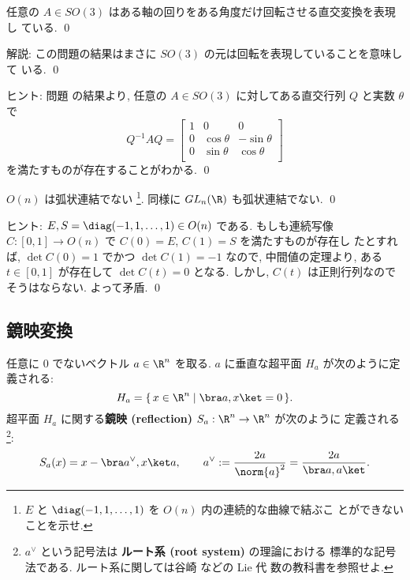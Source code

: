 \documentclass[12pt,twoside]{jarticle}
\begin{document}

\begin{question}
  任意の $A\in SO(3)$ はある軸の回りをある角度だけ回転させる直交変換を表現し
  ている. \qed
\end{question}

\noindent
解説: この問題の結果はまさに $SO(3)$ の元は回転を表現していることを意味して
いる.
\qed

\medskip
\noindent
ヒント: 問題  の結果より, 
任意の $A\in SO(3)$ に対してある直交行列 $Q$ と実数 $\theta$ で
\begin{equation*}
  Q^{-1}AQ = 
  \begin{bmatrix}
    1 & 0          & 0 \\
    0 & \cos\theta & -\sin\theta \\
    0 & \sin\theta &  \cos\theta \\
  \end{bmatrix}
\end{equation*}
を満たすものが存在することがわかる. 
\qed


\begin{question}
  $O(n)$ は弧状連結でない%
  \footnote{$E$ と $\diag(-1,1,\dots,1)$ を $O(n)$ 内の連続的な曲線で結ぶこ
    とができないことを示せ.}. 
  同様に $GL_n(\R)$ も弧状連結でない. \qed
\end{question}

\noindent
ヒント: $E,S=\diag(-1,1,\dots,1)\in O(n)$ である.
もしも連続写像 $C:[0,1]\to O(n)$ で $C(0)=E$, $C(1)=S$ を満たすものが存在し
たとすれば, $\det C(0)=1$ でかつ $\det C(1)=-1$ なので, 
中間値の定理より, ある $t\in[0,1]$ が存在して $\det C(t)=0$ となる.
しかし, $C(t)$ は正則行列なのでそうはならない. よって矛盾.
\qed


\subsection{鏡映変換}
\label{sec:reflection}

任意に $0$ でないベクトル $a\in\R^n$ を取る.  
$a$ に垂直な超平面 $H_a$ が次のように定義される:
\begin{equation*}
  H_a = \{\, x\in\R^n \mid \bra a,x\ket = 0 \,\}.
\end{equation*}
超平面 $H_a$ に関する{\bf 鏡映 (reflection)} $S_a:\R^n\to\R^n$ が次のように
定義される%
\footnote{$a^\vee$ という記号法は {\bf ルート系 (root system)} の理論における
  標準的な記号法である. ルート系に関しては谷崎 \cite{tanisaki} などの Lie 代
  数の教科書を参照せよ.}: 
\begin{equation*}
  S_a(x) = x - \bra a^\vee, x \ket a,
  \qquad a^\vee := \frac{2a}{\norm{a}^2} = \frac{2a}{\bra a, a\ket}.
\end{equation*}
\end{document}
